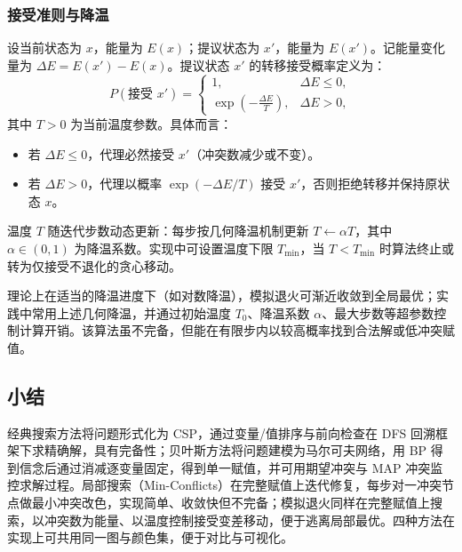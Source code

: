 \subsubsection{接受准则与降温}
\label{sec:sa-accept}

设当前状态为 $x$，能量为 $E(x)$；提议状态为 $x'$，能量为 $E(x')$。记能量变化量为 $\Delta E = E(x') - E(x)$。提议状态 $x'$ 的转移接受概率定义为：
\begin{equation}
  P(\text{接受 } x') =
  \begin{cases}
    1, & \Delta E \le 0, \\
    \exp\!\left(-\frac{\Delta E}{T}\right), & \Delta E > 0,
  \end{cases}
\end{equation}
其中 $T > 0$ 为当前温度参数。具体而言：
\begin{itemize}
  \item 若 $\Delta E \le 0$，代理必然接受 $x'$（冲突数减少或不变）。
  \item 若 $\Delta E > 0$，代理以概率 $\exp(-\Delta E / T)$ 接受 $x'$，否则拒绝转移并保持原状态 $x$。
\end{itemize}

温度 $T$ 随迭代步数动态更新：每步按几何降温机制更新 $T \leftarrow \alpha T$，其中 $\alpha \in (0,1)$ 为降温系数。实现中可设置温度下限 $T_{\min}$，当 $T < T_{\min}$ 时算法终止或转为仅接受不退化的贪心移动。

理论上在适当的降温进度下（如对数降温），模拟退火可渐近收敛到全局最优；实践中常用上述几何降温，并通过初始温度 $T_0$、降温系数 $\alpha$、最大步数等超参数控制计算开销。该算法虽不完备，但能在有限步内以较高概率找到合法解或低冲突赋值。

\subsection{小结}
\label{sec:summary}

经典搜索方法将问题形式化为 CSP，通过变量/值排序与前向检查在 DFS 回溯框架下求精确解，具有完备性；贝叶斯方法将问题建模为马尔可夫网络，用 BP 得到信念后通过消减逐变量固定，得到单一赋值，并可用期望冲突与 MAP 冲突监控求解过程。局部搜索（Min-Conflicts）在完整赋值上迭代修复，每步对一冲突节点做最小冲突改色，实现简单、收敛快但不完备；模拟退火同样在完整赋值上搜索，以冲突数为能量、以温度控制接受变差移动，便于逃离局部最优。四种方法在实现上可共用同一图与颜色集，便于对比与可视化。
